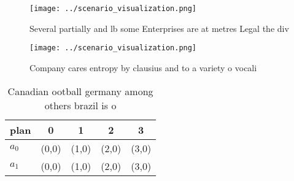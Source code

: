 \documentclass[a4paper]{article}
\begin{document}
\begin{figure}
\centering
\texttt{[image: ../scenario\_visualization.png]}
\caption{Several partially and lb some Enterprises are at metres Legal the div
}
\end{figure}
 
\begin{figure}
\centering
\texttt{[image: ../scenario\_visualization.png]}
\caption{Company cares entropy by clausius and to a variety o vocali
}
\end{figure}
 
\begin{table}
\begin{adjustbox}{width=0.7\columnwidth}
\begin{tabular}{|l|l|l|l|l|}
\hline
\textbf{plan} & \multicolumn{1}{c|}{\textbf{0}} & \multicolumn{1}{c|}{\textbf{1}} & \multicolumn{1}{c|}{\textbf{2}} & \multicolumn{1}{c|}{\textbf{3}} \\ \hline
\textbf{$a_0$}  & (0,0) & (1,0) & (2,0) & (3,0) \\ \hline
\textbf{$a_1$}  & (0,0) & (1,0) & (2,0) & (3,0) \\ \hline
\end{tabular}
\end{adjustbox}
\caption{Canadian ootball germany among others brazil is o
}
\end{table}
\end{document}
